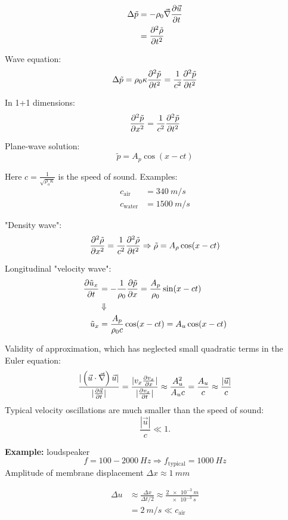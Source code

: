 \begin{align}
\Delta\tilde{p} &= -\rho_0\vec{\nabla}\frac{\partial \vec{u}}{\partial t} \\
&= \frac{\partial^2 \tilde{\rho}}{\partial t^2}
\end{align}

Wave equation:
\begin{equation}
\Delta\tilde{p} = \rho_0\kappa\frac{\partial^2 \tilde{p}}{\partial t^2} = \frac{1}{c^2}\frac{\partial^2 \tilde{p}}{\partial t^2}
\end{equation}

In 1+1 dimensions:
\begin{equation}
\frac{\partial^2 \tilde{p}}{\partial x^2} = \frac{1}{c^2}\frac{\partial^2 \tilde{p}}{\partial t^2}
\end{equation}

Plane-wave solution:
\begin{equation}
\tilde{p} = A_p\cos(x-ct)
\end{equation}

Here $c=\frac{1}{\sqrt{\rho_o\kappa}}$ is the speed of sound. Examples:
\begin{align}
c_\mathrm{air} &= \SI{340}{m/s} \\
c_\mathrm{water} &= \SI{1500}{m/s}
\end{align}

"Density wave":
\begin{equation}
\frac{\partial^2 \tilde{\rho}}{\partial x^2} = \frac{1}{c^2}\frac{\partial^2 \tilde{\rho}}{\partial t^2} \Rightarrow \tilde{\rho}=A_\rho\cos(x-ct)
\end{equation}

Longitudinal "velocity wave":
\begin{align}
\frac{\partial \tilde{u}_x}{\partial t} &= -\frac{1}{\rho_0}\frac{\partial \tilde{p}}{\partial x}= \frac{A_p}{\rho_0}\sin(x-ct) \\
&\Downarrow\notag\\
\tilde{u}_x &= \frac{A_p}{\rho_0c}\cos(x-ct) = A_u\cos(x-ct)
\end{align}

Validity of approximation, which has neglected small quadratic terms in the Euler equation:
\begin{align}
\frac{|\left(\vec{u}\cdot\vec{\nabla}\right)\vec{u}|}{|\frac{\partial \vec{u}}{\partial t}|} = \frac{|v_x\frac{\partial v_x}{\partial x}|}{|\frac{\partial v_x}{\partial t}|} \approx \frac{A_u^2}{A_uc} = \frac{A_u}{c} \approx \frac{|\vec{u}|}{c}
\end{align}
Typical velocity oscillations are much smaller than the speed of sound:
\begin{equation}
\frac{|\vec{u}|}{c} \ll 1.
\end{equation}
\begin{framed}
\textbf{Example:} loudspeaker
\begin{equation}
f=100-\SI{2000}{Hz} \Rightarrow f_\mathrm{typical} = \SI{1000}{Hz}
\end{equation}
Amplitude of membrane displacement $\Delta x \approx \SI{1}{mm}$

\begin{align}
\Delta u &\approx \frac{\Delta x}{\Delta t/2} \approx \frac{\SI{2e-3}{m}}{\SI{e-3}{s}} \\
 &= \SI{2}{m/s} \ll c_\mathrm{air}
\end{align}
\end{framed}

